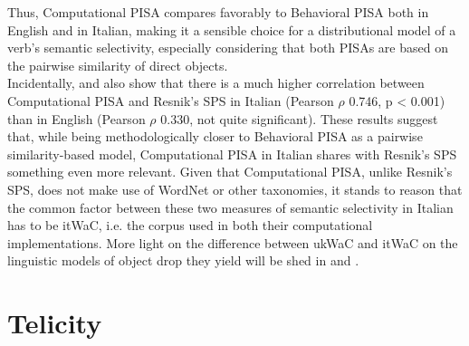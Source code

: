 Thus, Computational PISA compares favorably to Behavioral PISA both in English and in Italian, making it a sensible choice for a distributional model of a verb's semantic selectivity, especially considering that both PISAs are based on the pairwise similarity of direct objects.\\
Incidentally,  and  also show that there is a much higher correlation between Computational PISA and Resnik's SPS in Italian (Pearson $\rho$ 0.746, p < 0.001) than in English (Pearson $\rho$ 0.330, not quite significant). These results suggest that, while being methodologically closer to Behavioral PISA as a pairwise similarity-based model, Computational PISA in Italian shares with Resnik's SPS something even more relevant. Given that Computational PISA, unlike Resnik's SPS, does not make use of WordNet or other taxonomies, it stands to reason that the common factor between these two measures of semantic selectivity in Italian has to be itWaC, i.e. the corpus used in both their computational implementations. More light on the difference between ukWaC and itWaC on the linguistic models of object drop they yield will be shed in  and .


\section{Telicity} 


